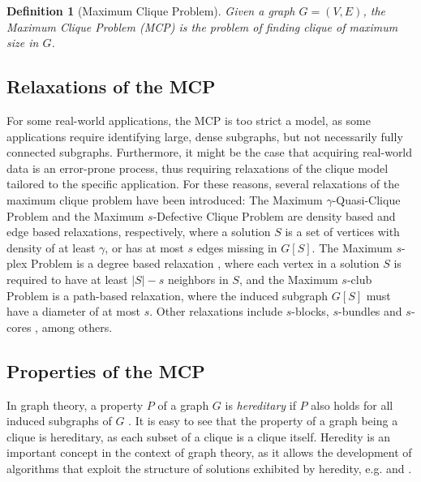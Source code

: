 \documentclass[draft,final]{vutinfth} %
\newtheorem{definition}{Definition}[section]
\begin{document}
\begin{definition}[Maximum Clique Problem]
	\label{def:mcp}
	Given a graph $G = (V,E)$, the Maximum Clique Problem (MCP) is the problem of finding clique of maximum size in $G$. 
\end{definition}

\subsection{Relaxations of the MCP}

For some real-world applications, the MCP is too strict a model, as some applications require identifying large, dense subgraphs, but not necessarily fully connected subgraphs. 
Furthermore, it might be the case that acquiring real-world data is an error-prone process, thus requiring relaxations of the clique model tailored to the specific application. 
For these reasons, several relaxations of the maximum clique problem have been introduced: The Maximum $\gamma$-Quasi-Clique Problem \cite{Abello2002} and the Maximum $s$-Defective Clique Problem \cite{Yu2006} are density based and edge based relaxations, respectively, where a solution $S$ is a set of vertices with density of at least $\gamma$, or has at most $s$ edges missing in $G[S]$. 
The Maximum $s$-plex Problem is a degree based relaxation \cite{Seidman1978}, where each vertex in a solution $S$ is required to have at least $|S| - s$ neighbors in $S$, and the Maximum $s$-club Problem \cite{Mokken1979} is a path-based relaxation, where the induced subgraph $G[S]$ must have a diameter of at most $s$. Other relaxations include $s$-blocks, $s$-bundles and $s$-cores \cite{Gschwind2015}, among others. 

\subsection{Properties of the MCP}

In graph theory, a property $P$ of a graph $G$ is \textit{hereditary} if $P$ also holds for all induced subgraphs of $G$ \cite{pattillo_maximum_2013}. It is easy to see that the property of a graph being a clique is hereditary, as each subset of a clique is a clique itself. Heredity is an important concept in the context of graph theory, as it allows the development of algorithms that exploit the structure of solutions exhibited by heredity, e.g. \cite{Trukhanov2013} and \cite{GSCHWIND2018131}.  
\end{document}
